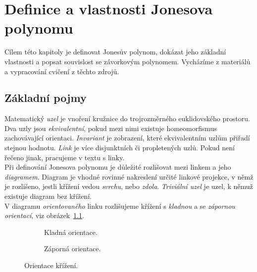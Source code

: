 
\chapter{Definice a vlastnosti Jonesova polynomu}
Cílem této kapitoly je definovat Jonesův polynom, dokázat jeho základní vlastnosti a popsat souvislost se závorkovým polynomem. Vycházíme z materiálů~\cite{cromwell2004knots, Adams2004, jones2005, weiping2016lecture} a vypracování cvičení z těchto zdrojů.
\section{Základní pojmy}
Matematický \emph{uzel} je vnoření kružnice do trojrozměrného euklidovského prostoru. Dva uzly jsou \emph{ekvivalentní}, pokud mezi nimi existuje homeomorfismus zachovávající orientaci. \emph{Invariant} je zobrazení, které ekvivalentním uzlům přiřadí stejnou hodnotu.
\emph{Link} je více disjunktních či propletených uzlů. Pokud není řečeno jinak, pracujeme v textu s linky. 
\\
Při definování Jonesova polynomu je důležité rozlišovat mezi linkem a jeho \emph{diagramem}. Diagram je vhodné rovinné nakreslení určité linkové projekce, v němž je rozlišeno, jestli křížení vedou \emph{svrchu}, nebo \emph{zdola}.  \emph{Triviální uzel} je uzel, k němuž existuje diagram bez křížení.
\\
V diagramu \emph{orientovaného} linku rozlišujeme křížení s \emph{kladnou} a se \emph{zápornou orientací}, viz obrázek~\ref{orientace}.

\begin{figure}[h]    

\centering 
\begin{subfigure}[t]{0.4\linewidth}\centering
{} 
\caption{Kladná orientace.} 
\end{subfigure}
\begin{subfigure}[t]{0.4\linewidth}\centering
{}  
\caption{Záporná orientace.}
\end{subfigure}

\caption{Orientace křížení.}
\label{orientace}
\end{figure}  


